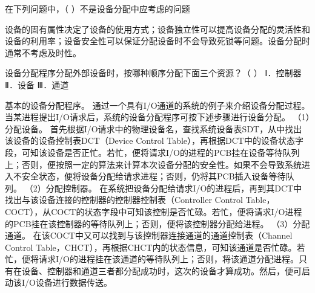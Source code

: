 \question 在下列问题中，（ ）不是设备分配中应考虑的问题
\par{}
\begin{solution}设备的固有属性决定了设备的使用方式；设备独立性可以提高设备分配的灵活性和设备的利用率；设备安全性可以保证分配设备时不会导致死锁等问题。设备分配时通常不考虑及时性。
\end{solution}
\question 设备分配程序分配外部设备时，按哪种顺序分配下面三个资源？（ ） Ⅰ．控制器
Ⅱ．设备 Ⅲ．通道
\par{}
\begin{solution}基本的设备分配程序。
通过一个具有I/O通道的系统的例子来介绍设备分配过程。当某进程提出I/O请求后，系统的设备分配程序可按下述步骤进行设备分配。
（1）分配设备。
首先根据I/O请求中的物理设备名，查找系统设备表SDT，从中找出该设备的设备控制表DCT（Device
Control
Table），再根据DCT中的设备状态字段，可知该设备是否正忙。若忙，便将请求I/O的进程的PCB挂在设备等待队列上；否则，便按照一定的算法来计算本次设备分配的安全性。如果不会导致系统进入不安全状态，便将设备分配给请求进程；否则，仍将其PCB插入设备等待队列。
（2）分配控制器。
在系统把设备分配给请求I/O的进程后，再到其DCT中找出与该设备连接的控制器的控制器控制表（Controller
Control
Table，COCT），从COCT的状态字段中可知该控制是否忙碌。若忙，便将请求I/O进程的PCB挂在该控制器的等待队列上；否则，便将该控制器分配给进程。
（3）分配通道。
在该COCT中又可以找到与该控制器连接通道的通道控制表（Channel Control
Table，CHCT），再根据CHCT内的状态信息，可知该通道是否忙碌。若忙，便将请求I/O的进程挂在该通道的等待队列上；否则，将该通道分配进程。只有在设备、控制器和通道三者都分配成功时，这次的设备才算成功。然后，便可启动该I/O设备进行数据传送。
\end{solution}
